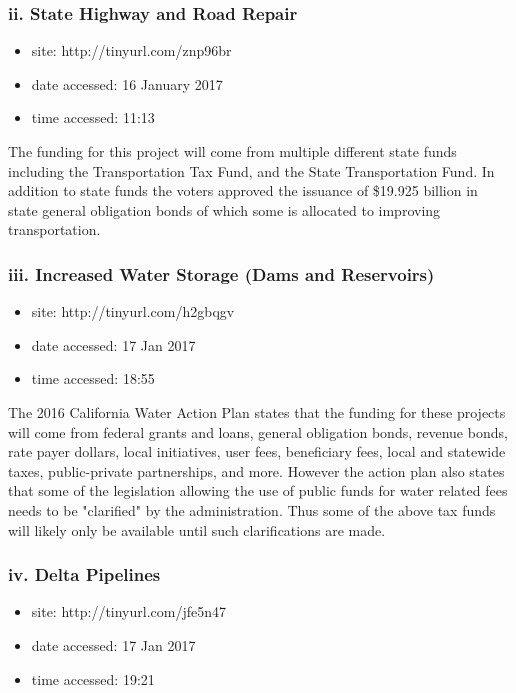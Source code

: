 \documentclass[12pt]{article}
\renewcommand{\=}[1]{\stackrel{#1}{=}} %
\theoremstyle{definition}
\theoremstyle{remark}
\begin{document}
\subsubsection{ii. State Highway and Road Repair}
\begin{itemize}
	\item site: {\small http://tinyurl.com/znp96br}
	\item date accessed: 16 January 2017
	\item time accessed: 11:13
\end{itemize}

The funding for this project will come from multiple different state funds including the Transportation Tax Fund, and the State Transportation Fund. In addition to state funds the voters approved the issuance of \$19.925 billion in state general obligation bonds of which some is allocated to improving transportation.

\subsubsection{iii. Increased Water Storage (Dams and Reservoirs)}
\begin{itemize}
	\item site: {\small http://tinyurl.com/h2gbqgv}
	\item date accessed: 17 Jan 2017
	\item time accessed: 18:55
\end{itemize}

The 2016 California Water Action Plan states that the funding for these projects will come from federal grants and loans, general obligation bonds, revenue bonds, rate payer dollars, local initiatives, user fees, beneficiary fees, local and statewide taxes, public-private partnerships, and more. However the action plan also states that some of the legislation allowing the use of public funds for water related fees needs to be "clarified" by the administration. Thus some of the above tax funds will likely only be available until such clarifications are made.

\subsubsection{iv. Delta Pipelines}
\begin{itemize}
	\item site: {\small http://tinyurl.com/jfe5n47}
	\item date accessed: 17 Jan 2017
	\item time accessed: 19:21
\end{itemize}
\end{document}
